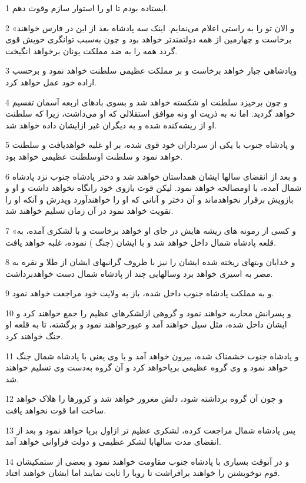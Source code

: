 \par 1 ایستاده بودم تا او را استوار سازم وقوت دهم.
\par 2 «و الان تو را به راستی اعلام می‌نمایم. اینک سه پادشاه بعد از این در فارس خواهند برخاست و چهارمین از همه دولتمندتر خواهد بود و چون به‌سبب توانگری خویش قوی گردد همه را به ضد مملکت یونان برخواهد انگیخت.
\par 3 وپادشاهی جبار خواهد برخاست و بر مملکت عظیمی سلطنت خواهد نمود و برحسب اراده خود عمل خواهد کرد.
\par 4 و چون برخیزد سلطنت او شکسته خواهد شد و بسوی بادهای اربعه آسمان تقسیم خواهد گردید. اما نه به ذریت او ونه موافق استقلالی که او می‌داشت، زیرا که سلطنت او از ریشه‌کنده شده و به دیگران غیر ازایشان داده خواهد شد.
\par 5 و پادشاه جنوب با یکی از سرداران خود قوی شده، بر او غلبه خواهدیافت و سلطنت خواهد نمود و سلطنت اوسلطنت عظیمی خواهد بود.
\par 6 و بعد از انقضای سالها ایشان همداستان خواهند شد و دختر پادشاه جنوب نزد پادشاه شمال آمده، با اومصالحه خواهد نمود. لیکن قوت بازوی خود رانگاه نخواهد داشت و او و بازویش برقرار نخواهدماند و آن دختر و آنانی که او را خواهند‌آورد وپدرش و آنکه او را تقویت خواهد نمود در آن زمان تسلیم خواهند شد.
\par 7 «و کسی از رمونه های ریشه هایش در جای او خواهد برخاست و با لشکری آمده، به قلعه پادشاه شمال داخل خواهد شد و با ایشان (جنگ ) نموده، غلبه خواهد یافت.
\par 8 و خدایان وبتهای ریخته شده ایشان را نیز با ظروف گرانبهای ایشان از طلا و نقره به مصر به اسیری خواهد برد وسالهایی چند از پادشاه شمال دست خواهدبرداشت.
\par 9 و به مملکت پادشاه جنوب داخل شده، باز به ولایت خود مراجعت خواهد نمود.
\par 10 و پسرانش محاربه خواهند نمود و گروهی ازلشکرهای عظیم را جمع خواهند کرد و ایشان داخل شده، مثل سیل خواهند آمد و عبورخواهند نمود و برگشته، تا به قلعه او جنگ خواهند کرد.
\par 11 و پادشاه جنوب خشمناک شده، بیرون خواهد آمد و با وی یعنی با پادشاه شمال جنگ خواهد نمود و وی گروه عظیمی برپاخواهد کرد و آن گروه به‌دست وی تسلیم خواهند شد.
\par 12 و چون آن گروه برداشته شود، دلش مغرور خواهد شد و کرورها را هلاک خواهد ساخت اما قوت نخواهد یافت.
\par 13 پس پادشاه شمال مراجعت کرده، لشکری عظیم تر ازاول برپا خواهد نمود و بعد از انقضای مدت سالهابا لشکر عظیمی و دولت فراوانی خواهد آمد.
\par 14 و در آنوقت بسیاری با پادشاه جنوب مقاومت خواهند نمود و بعضی از ستمکیشان قوم توخویشتن را خواهند برافراشت تا رویا را ثابت نمایند اما ایشان خواهند افتاد.
